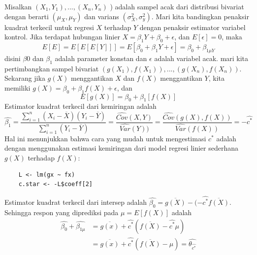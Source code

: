 \documentclass[a4paper,12pt]{article}
\theoremstyle{definition}
\begin{document}
Misalkan $\left ( X_{1},Y_{1} \right ),...,( X_{n},Y_{n} )$ ) adalah sampel acak dari distribusi bivariat dengan berarti $\left ( \mu _{X},\mu _{Y} \right )$ dan varians $\left ( \sigma ^{2}_{X},\sigma ^{2}_{y} \right )$. Mari kita bandingkan penaksir kuadrat terkecil untuk regresi $X$ terhadap $Y$ dengan penaksir estimator variabel kontrol.
Jika terdapat hubungan linier $X=\beta _{1}Y+\beta _{0}+\epsilon $, dan $E\left [ \epsilon  \right ]=0$, maka
\begin{equation*}
    E\left [ E \right ]=E\left [ E\left [ E\left [ Y \right ] \right ] \right ]=E\left [ \beta _{0}+\beta_{1}Y+\epsilon  \right ]=\beta_{0}+\beta_{1\mu Y}
\end{equation*}
disini $\beta{0}$ dan $\beta_{1}$ adalah parameter konstan dan $\epsilon$ adalah variabel acak. mari kita pertimbangkan sampel bivariat $\left ( g\left ( X_{1} \right ),f\left ( X_{1} \right ) \right ),...,\left ( g\left ( X_{n} \right ),f\left ( X_{n} \right ) \right )$. Sekarang jika $g(X)$ menggantikan $X$
dan $f(X)$ menggantikan $Y$, kita memiliki $g\left ( X \right )=\beta_{0}+\beta_{1}f(X)+\epsilon$, dan 
\begin{equation*}
    E\left [ g\left ( X \right ) \right ]=\beta_{0}+\beta_{1}\left [ f(X) \right ]
\end{equation*}
Estimator kuadrat terkecil dari kemiringan adalah
\begin{equation*}
    \widehat{\beta_{1}}=\frac{\sum_{i=1}^{n}(X_{i}-\overline{X})(Y_{i}-\overline{Y})}{\sum_{i=1}^{n}(Y_{i}-\overline{Y})}=\frac{\widehat{Cov}(X,Y)}{\widehat{Var}(Y))}=\frac{\widehat{Cov}(g(X),f(X))}{\widehat{Var}(f(X))}=-\widehat{c^{*}}
\end{equation*}
Hal ini menunjukkan bahwa cara yang mudah untuk mengestimasi $c^{*}$ adalah dengan menggunakan estimasi kemiringan dari model regresi linier sederhana $g(X)$ terhadap $f(X)$:
\begin{lstlisting}
    L <- lm(gx ~ fx)
    c.star <- -L$coeff[2]
\end{lstlisting}
Estimator kuadrat terkecil dari intersep adalah $\widehat{\beta_{0}}=\overline{g(X)}-(-\widehat{c^{*}}\overline{f(X)}$. Sehingga respon yang diprediksi pada $\mu = E\left [ f\left ( X \right ) \right ]$ adalah 
\begin{equation*}
    \begin{split}
        \widehat{\beta_{0}}+\widehat{\beta_{1\mu}}&=\overline{g(x)}+\widehat{c^{*}}(\overline{f(X)}-\widehat{c^{*}}\mu)\\
        &=\overline{g(x)}+\widehat{c^{*}}(\overline{f(X)}-\mu)=\widehat{\theta_{\widehat{c^{*}}}}
    \end{split}
\end{equation*}
\end{document}
